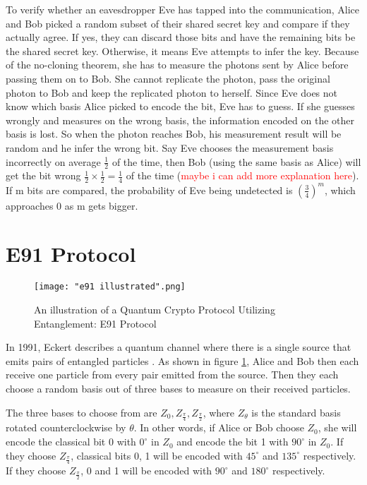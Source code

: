 To verify whether an eavesdropper Eve has tapped into the communication, Alice and Bob picked a random subset of their shared secret key and compare if they actually agree. If yes, they can discard those bits and have the remaining bits be the shared secret key. Otherwise, it means Eve attempts to infer the key. Because of the no-cloning theorem, she has to measure the photons sent by Alice before passing them on to Bob. She cannot replicate the photon, pass the original photon to Bob and keep the replicated photon to herself. Since Eve does not know which basis Alice picked to encode the bit, Eve has to guess. If she guesses wrongly and measures on the wrong basis, the information encoded on the other basis is lost. So when the photon reaches Bob, his measurement result will be random and he infer the wrong bit. Say Eve chooses the measurement basis incorrectly on average $\frac{1}{2}$ of the time, then Bob (using the same basis as Alice) will get the bit wrong $\frac{1}{2} \times \frac{1}{2}=\frac{1}{4}$ of the time (\textcolor{red}{maybe i can add more explanation here}). If m bits are compared, the probability of Eve being undetected is $(\frac{3}{4})^m$, which approaches 0 as m gets bigger.

\pagebreak


\section{E91 Protocol} \label{section: e91}
\begin{figure}[h]
    \centering
    \texttt{[image: "e91 illustrated".png]}
    \caption{An illustration of a Quantum Crypto Protocol Utilizing Entanglement: E91 Protocol \protect\footnotemark}
    \label{fig:E91 Illustrated}
\end{figure}
In 1991, Eckert describes a quantum channel where there is a single source that emits pairs of entangled particles \cite{Ekert1991}. As shown in figure \ref{fig:E91 Illustrated}, Alice and Bob then each receive one particle from every pair emitted from the source. Then they each choose a random basis out of three bases to measure on their received particles. 

The three bases to choose from are $Z_0, Z_{\frac{\pi}{4}}, Z_{\frac{\pi}{2}}$, where $Z_\theta$ is the standard basis rotated counterclockwise by $\theta$. In other words, if Alice or Bob choose $Z_0$, she will encode the classical bit 0 with  $0^\circ$ in $Z_0$ and encode the bit 1 with $90^\circ$ in $Z_0$. If they choose $Z_{\frac{\pi}{4}}$, classical bits 0, 1 will be encoded with $45^\circ$ and $135^\circ$ respectively. If they choose $Z_{\frac{\pi}{2}}$, 0 and 1 will be encoded with $90^\circ$ and $180^\circ$ respectively.

